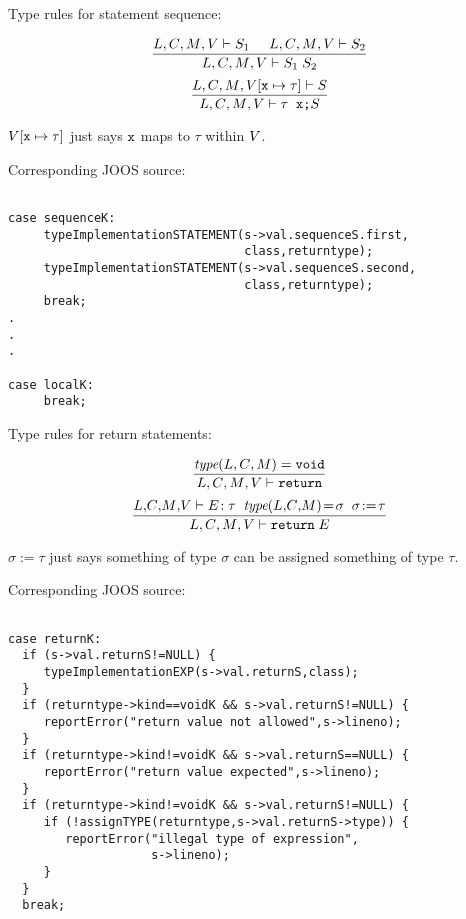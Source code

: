 \begin{slide*}
Type rules for statement sequence:

$$ \frac{\mbox{$L$}{},\mbox{$C$}{},\mbox{$M$}{},\mbox{$V$}{} \vdash S_1\;\;\;\;\;
         \mbox{$L$}{},\mbox{$C$}{},\mbox{$M$}{},\mbox{$V$}{} \vdash S_2}{
        \mbox{$L$}{},\mbox{$C$}{},\mbox{$M$}{},\mbox{$V$}{} \vdash S_1\; S_2} $$
$$ \frac{\mbox{$L$}{},\mbox{$C$}{},\mbox{$M$}{},\mbox{$V$}{}[\mbox{\tt x} \mapsto \tau] \vdash S}{
         \mbox{$L$}{},\mbox{$C$}{},\mbox{$M$}{},\mbox{$V$}{} \vdash \tau\;\; \mbox{\tt x;} S}$$

$\mbox{$V$}{}[\mbox{\tt x} \mapsto \tau]$ just says ${\tt x}$ maps to
        $\tau$ within $\mbox{$V$}{}$.

Corresponding JOOS source:

\begin{scriptsize}
\begin{verbatim}

case sequenceK:
     typeImplementationSTATEMENT(s->val.sequenceS.first,
                                 class,returntype);
     typeImplementationSTATEMENT(s->val.sequenceS.second,
                                 class,returntype);
     break;
.
.
.

case localK:
     break;
\end{verbatim}
\end{scriptsize}
\vfil
\end{slide*}
 
\begin{slide*}
Type rules for return statements:

$$ \frac{\mbox{\em type}(\mbox{$L$}{},\mbox{$C$}{},\mbox{$M$}{}) = \mbox{\tt void}}{
         \mbox{$L$}{},\mbox{$C$}{},\mbox{$M$}{},\mbox{$V$}{} \vdash \mbox{\tt return}} $$
$$ \frac{\lib{},\!\class{},\!\method{},\!\vars{} \vdash E\!: \tau\;\;
         \mbox{\em type}(\lib{},\!\class{},\!\method{})\!=\!\sigma\;\; \sigma\!:=\!\tau}{
         \lib{},\class{},\method{},\vars{} \vdash \mbox{\tt return}\; E} $$

$\sigma\!:=\!\tau$ just says something of type $\sigma$ can be
assigned something of type $\tau$.

Corresponding JOOS source:
 
\begin{scriptsize}
\begin{verbatim}

case returnK:
  if (s->val.returnS!=NULL) {
     typeImplementationEXP(s->val.returnS,class);
  }
  if (returntype->kind==voidK && s->val.returnS!=NULL) {
     reportError("return value not allowed",s->lineno);
  }
  if (returntype->kind!=voidK && s->val.returnS==NULL) {
     reportError("return value expected",s->lineno);
  }
  if (returntype->kind!=voidK && s->val.returnS!=NULL) {
     if (!assignTYPE(returntype,s->val.returnS->type)) {
        reportError("illegal type of expression",
                    s->lineno);
     }
  }
  break;
\end{verbatim}
\end{scriptsize}

\vfil
\end{slide*}
 
